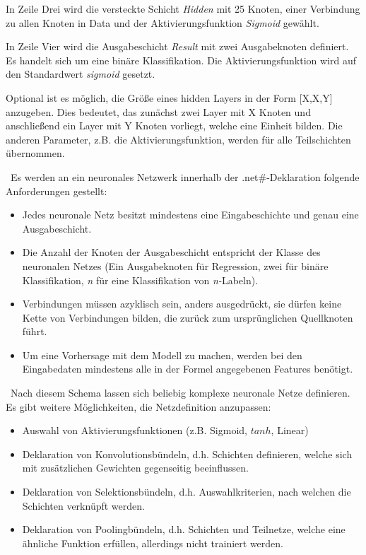 In Zeile Drei wird die versteckte Schicht \textit{Hidden} mit 25 Knoten, einer Verbindung zu allen Knoten in Data und der Aktivierungsfunktion \textit{Sigmoid} gewählt. 

In Zeile Vier wird die Ausgabeschicht \textit{Result} mit zwei Ausgabeknoten definiert. Es handelt sich um eine binäre Klassifikation. Die Aktivierungsfunktion wird auf den Standardwert \textit{sigmoid} gesetzt. 

Optional ist es möglich, die Größe eines hidden Layers in der Form [X,X,Y] anzugeben. Dies bedeutet, das zunächst zwei Layer mit X Knoten und anschließend ein Layer mit Y Knoten vorliegt, welche eine Einheit bilden. Die anderen Parameter, z.B. die Aktivierungsfunktion, werden für alle Teilschichten übernommen.

~\newline Es werden an ein neuronales Netzwerk innerhalb der .net\#-Deklaration folgende Anforderungen gestellt:

\begin{itemize}
	\item Jedes neuronale Netz besitzt mindestens eine Eingabeschichte und genau eine Ausgabeschicht.
	\item Die Anzahl der Knoten der Ausgabeschicht entspricht der Klasse des neuronalen Netzes (Ein Ausgabeknoten für Regression, zwei für binäre Klassifikation, \textit{n} für eine Klassifikation von \textit{n-}Labeln).
	\item Verbindungen müssen azyklisch sein, anders ausgedrückt, sie dürfen keine Kette von Verbindungen bilden, die zurück zum ursprünglichen Quellknoten führt.
	\item Um eine Vorhersage mit dem Modell zu machen, werden bei den Eingabedaten mindestens alle in der Formel angegebenen Features benötigt. 
\end{itemize}

~\newline Nach diesem Schema lassen sich beliebig komplexe neuronale Netze definieren. Es gibt weitere Möglichkeiten, die Netzdefinition anzupassen:

\begin{itemize}
	\item Auswahl von Aktivierungsfunktionen (z.B. Sigmoid, $tanh$, Linear)
	\item Deklaration von Konvolutionsbündeln, d.h. Schichten definieren, welche sich mit zusätzlichen Gewichten gegenseitig beeinflussen.
	\item Deklaration von Selektionsbündeln, d.h. Auswahlkriterien, nach welchen die Schichten verknüpft werden.
	\item Deklaration von Poolingbündeln, d.h. Schichten und Teilnetze, welche eine ähnliche Funktion erfüllen, allerdings nicht trainiert werden. 
\end{itemize} 
\newpage
